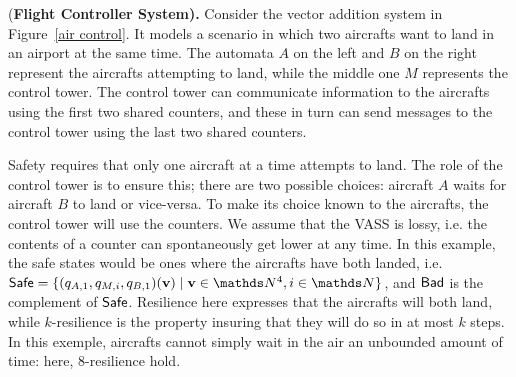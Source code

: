 \begin{example}\label{Example}
{(\bf Flight Controller System).}
Consider the vector addition system in Figure~\ref{air control}. It models a scenario in which two aircrafts want to land in an airport at the same time. 
The automata $A$ on the left and $B$ on the right represent the aircrafts attempting to land, while the middle one $M$ represents the control tower. The control tower can communicate information to the aircrafts using 
the first two shared counters, and these in turn can send messages to the control tower
using the last two shared counters. 

Safety requires that only one aircraft at a time attempts to land. The role of the control tower is to ensure this;
there are two possible choices: aircraft $A$ waits for aircraft $B$ to land
or vice-versa. To make its choice known to the aircrafts, the control tower will use the counters. 
We assume that the VASS is
lossy, i.e. 
 the contents of a counter can spontaneously get lower at any time.
In this example, the safe states would be ones where the aircrafts have both landed, i.e.
$\Safe = \{(q_{A,1}, q_{M,i}, q_{B,1})(\textbf{v}) \mid \textbf{v} \in \N^4, i \in \N\}$, and $\textsf{Bad}$ is the complement of $\textsf{Safe}$. 
Resilience here expresses that the aircrafts will both land, while $k$-resilience is the property insuring that they will do so in at most $k$ steps. 
In this exemple, aircrafts cannot simply wait in the air an unbounded amount of time: here, $8$-resilience hold.
\end{example}





